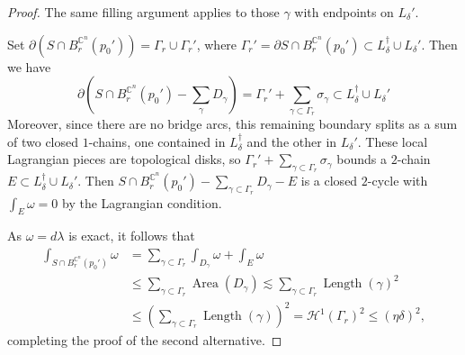 \documentclass[11pt,a4paper]{article}
\numberwithin{equation}{section}%
\theoremstyle{definition}
\newcommand{\C}{\mathbb{C}}
\begin{document}
\begin{proof}
    The same filling argument applies to those $\gamma$ with endpoints on $L_\delta'$. 

    Set $\partial(S\cap B_r^{\C^n}(p_0'))=\Gamma_r\cup \Gamma_r'$, where $\Gamma_r'=\partial S\cap B_{r}^{\C^n}(p_0')\subset L_\delta^{\dagger} \cup L_\delta'$. Then we have  
    $$\partial\left(S\cap B_{r}^{\C^n}
    (p_0')-\sum_{\gamma} D_\gamma\right)=\Gamma_r'+\sum_{\gamma\subset \Gamma_r}\sigma_\gamma\subset  L_\delta^\dagger\cup L_\delta'$$
Moreover, since there are no bridge arcs, this remaining boundary splits as a sum of two closed \(1\)-chains, one contained in \(L_\delta^\dagger\) and the other in \(L_\delta'\). These local Lagrangian pieces are topological disks, so \(\Gamma_r'+\sum\limits_{\gamma\subset\Gamma_r}\sigma_\gamma\) bounds a \(2\)-chain
$
    E\subset L_\delta^\dagger\cup L_\delta'$. 
Then $S\cap B_r^{\C^n}(p_0')-\sum\limits_{\gamma\subset \Gamma_r} D_\gamma-E$
is a closed \(2\)-cycle with $\int_E\omega=0$ by the Lagrangian condition. 
   
As $\omega=d\lambda$ is exact, it follows that
    \begin{equation*}
        \begin{aligned}
            \int_{S\cap B_r^{\C^n}(p_0')}\omega&=\sum_{\gamma\subset \Gamma_r}\int_{D_\gamma}\omega+\int_E \omega\\&\leqslant \sum_{\gamma\subset \Gamma_r}\operatorname{Area}(D_\gamma)\lesssim\sum_{\gamma\subset \Gamma_r}\operatorname{Length}(\gamma)^2\\&\leqslant  \left(\sum_{\gamma\subset \Gamma_r}\operatorname{Length}(\gamma)\right)^2=\mathcal{H}^1(\Gamma_r)^2\leqslant (\eta\delta)^2,
        \end{aligned}
    \end{equation*}
    completing the proof of the second alternative.
\end{proof}
\end{document}
